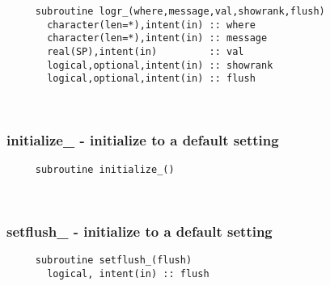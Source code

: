 \begin{verbatim} 
     subroutine logr_(where,message,val,showrank,flush)
       character(len=*),intent(in) :: where
       character(len=*),intent(in) :: message
       real(SP),intent(in)         :: val
       logical,optional,intent(in) :: showrank
       logical,optional,intent(in) :: flush
 \end{verbatim}%
 
 
\mbox{}\hrulefill\ 
 
  \subsubsection{initialize\_ - initialize to a default setting}

\begin{verbatim} 
     subroutine initialize_()
 \end{verbatim}%
 
 
\mbox{}\hrulefill\ 

  \subsubsection{setflush\_ - initialize to a default setting}

\begin{verbatim} 
     subroutine setflush_(flush)
       logical, intent(in) :: flush
 \end{verbatim}%


 
 
